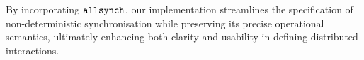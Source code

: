 \begin{itemize}
  By incorporating $\mathtt{allsynch}$, our implementation streamlines the
  specification of non-deterministic synchronisation while preserving
  its precise operational semantics, ultimately enhancing both clarity
  and usability in defining distributed interactions.

\end{itemize}

  




